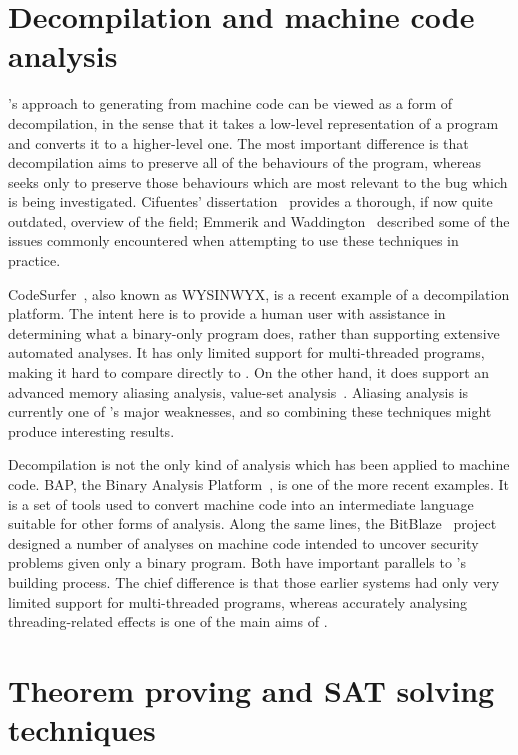 \section{Decompilation and machine code analysis}

{\Technique}'s approach to generating {\StateMachines} from machine
code can be viewed as a form of decompilation, in the sense that it
takes a low-level representation of a program and converts it to a
higher-level one.  The most important difference is that decompilation
aims to preserve all of the behaviours of the program, whereas
{\technique} seeks only to preserve those behaviours which are most
relevant to the bug which is being investigated.  Cifuentes'
dissertation~\cite{Cifuentes1994} provides a thorough, if now quite
outdated, overview of the field; Emmerik and
Waddington~\cite{Emmerik2004} described some of the issues commonly
encountered when attempting to use these techniques in practice.

CodeSurfer~\cite{Balakrishnan2008,Balakrishnan2005a}, also known as
WYSINWYX, is a recent example of a decompilation platform.  The intent
here is to provide a human user with assistance in determining what a
binary-only program does, rather than supporting extensive automated
analyses.  It has only limited support for multi-threaded programs,
making it hard to compare directly to {\technique}.  On the other
hand, it does support an advanced memory aliasing analysis, value-set
analysis~\cite{Balakrishnan2004}.  Aliasing analysis is currently one
of {\technique}'s major weaknesses, and so combining these techniques
might produce interesting results.

Decompilation is not the only kind of analysis which has been applied
to machine code.  BAP, the Binary Analysis
Platform~\cite{Brumley2011}, is one of the more recent examples.  It
is a set of tools used to convert machine code into an intermediate
language suitable for other forms of analysis.  Along the same lines,
the BitBlaze~\cite{Song2008} project designed a number of analyses on
machine code intended to uncover security problems given only a binary
program.  Both have important parallels to {\technique}'s
{\StateMachine} building process.  The chief difference is that those
earlier systems had only very limited support for multi-threaded
programs, whereas accurately analysing threading-related effects is
one of the main aims of {\technique}.

\section{Theorem proving and SAT solving techniques}

